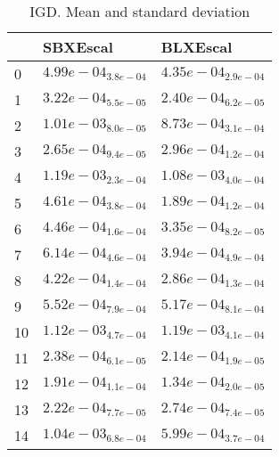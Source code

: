 \documentclass{article}
\begin{document}
\begin{table}
\caption{IGD. Mean and standard deviation}
\label{table:mean.IGD}
\centering
\begin{scriptsize}
\begin{tabular}{lll}
\hline & SBXEscal &  BLXEscal\\
\hline
0 & \cellcolor{gray25}$  4.99e-04_{ 3.8e-04}$ & \cellcolor{gray95}$  4.35e-04_{ 2.9e-04}$ \\
1 & \cellcolor{gray25}$  3.22e-04_{ 5.5e-05}$ & \cellcolor{gray95}$  2.40e-04_{ 6.2e-05}$ \\
2 & \cellcolor{gray25}$  1.01e-03_{ 8.0e-05}$ & \cellcolor{gray95}$  8.73e-04_{ 3.1e-04}$ \\
3 & \cellcolor{gray95}$  2.65e-04_{ 9.4e-05}$ & $  2.96e-04_{ 1.2e-04}$ \\
4 & \cellcolor{gray25}$  1.19e-03_{ 2.3e-04}$ & \cellcolor{gray95}$  1.08e-03_{ 4.0e-04}$ \\
5 & \cellcolor{gray25}$  4.61e-04_{ 3.8e-04}$ & \cellcolor{gray95}$  1.89e-04_{ 1.2e-04}$ \\
6 & \cellcolor{gray25}$  4.46e-04_{ 1.6e-04}$ & \cellcolor{gray95}$  3.35e-04_{ 8.2e-05}$ \\
7 & \cellcolor{gray25}$  6.14e-04_{ 4.6e-04}$ & \cellcolor{gray95}$  3.94e-04_{ 4.9e-04}$ \\
8 & \cellcolor{gray25}$  4.22e-04_{ 1.4e-04}$ & \cellcolor{gray95}$  2.86e-04_{ 1.3e-04}$ \\
9 & \cellcolor{gray25}$  5.52e-04_{ 7.9e-04}$ & \cellcolor{gray95}$  5.17e-04_{ 8.1e-04}$ \\
10 & \cellcolor{gray95}$  1.12e-03_{ 4.7e-04}$ & $  1.19e-03_{ 4.1e-04}$ \\
11 & \cellcolor{gray25}$  2.38e-04_{ 6.1e-05}$ & \cellcolor{gray95}$  2.14e-04_{ 1.9e-05}$ \\
12 & \cellcolor{gray25}$  1.91e-04_{ 1.1e-04}$ & \cellcolor{gray95}$  1.34e-04_{ 2.0e-05}$ \\
13 & \cellcolor{gray95}$  2.22e-04_{ 7.7e-05}$ & $  2.74e-04_{ 7.4e-05}$ \\
14 & \cellcolor{gray25}$  1.04e-03_{ 6.8e-04}$ & \cellcolor{gray95}$  5.99e-04_{ 3.7e-04}$ \\
\hline
\end{tabular}
\end{scriptsize}
\end{table}
\
\end{document}
